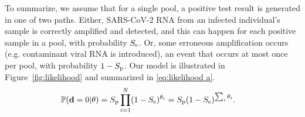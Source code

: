 \documentclass{article}
\begin{document}
To summarize, we assume that for a single pool, a positive test result
is generated in one of two paths. Either, SARS-CoV-2 RNA from an
infected individual's sample is correctly amplified and detected, and
this can happen for each positive sample in a pool, with probability
$S_\text{e}$. Or, some erroneous amplification occurs (e.g. contaminant viral
RNA is introduced), an event that occurs at most once per pool, with
probability $1-S_\text{p}$. Our model is illustrated in
Figure~\ref{fig:likelihood} and summarized in
\eqref{eq:likelihood a}.%
\begin{align}%
    \Pr(\data=0 | \theta) &= \spec\prod_{i=1}^N
    (1-\sens)^{\theta_i} = \spec(1-\Se)^{\sum_i\theta_i}. \label{eq:likelihood a}
\end{align}

\end{document}
